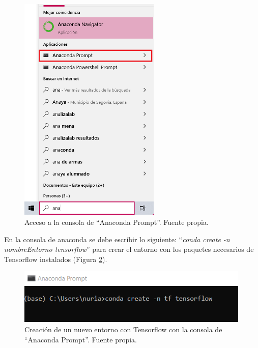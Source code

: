     \begin{figure}[h]
        \centering
        \includegraphics[width=0.60\textwidth]{img/acceso_consolaAnaconda.png}
        \caption{Acceso a la consola de ``Anaconda Prompt''. Fuente propia.}
        \label{fig:acceso_consolaAnaconda}
    \end{figure}
    \FloatBarrier
    
    En la consola de anaconda se debe escribir lo siguiente: ``\textit{conda create -n nombreEntorno tensorflow}'' para crear el entorno con los paquetes necesarios de Tensorflow instalados (Figura \ref{fig:nuevo_entorno}).
    
    \begin{figure}[h]
        \centering
        \includegraphics[width=0.99\textwidth]{img/nuevo_entorno.PNG}
        \caption{Creación de un nuevo entorno con Tensorflow con la consola de ``Anaconda Prompt''. Fuente propia.}
        \label{fig:nuevo_entorno}
    \end{figure}
   \FloatBarrier
    
